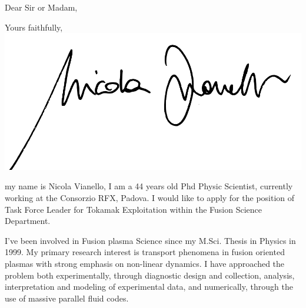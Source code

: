 \documentclass[12pt,a4paper,sans]{moderncv}        %
\begin{document}
\date{June 12, 2020}
\opening{Dear Sir or Madam,}
\closing{Yours faithfully, \\
  \vspace{2pt}
  \includegraphics[height=4\baselineskip]{signature.pdf}}
\makelettertitle
\justify
my name is Nicola Vianello, I am a 44 years old Phd Physic Scientist,
currently working at the Consorzio RFX, Padova. I would like to apply for
the position of Task Force Leader for Tokamak Exploitation within the Fusion Science
Department. 

I've been involved in Fusion plasma Science since my M.Sci. Thesis in
Physics in 1999. My primary research interest is transport phenomena in fusion
oriented plasmas with strong emphasis on non-linear dynamics. I have
approached the problem both experimentally, through diagnostic design
and collection, 
analysis, interpretation and modeling of experimental data, and
numerically, through the use of massive parallel fluid codes. 
\end{document}
